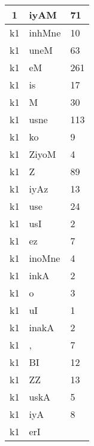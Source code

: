 \documentclass[a4 paper]{article}
\begin{document}
\begin{longtable}{cp{}p{}}
1 & iyAM & 71\\ \midrule k1 & inhMne & 10\\ \midrule k1 & uneM & 63\\ \midrule k1 & eM & 261\\ \midrule k1 & is & 17\\ \midrule k1 & M & 30\\ \midrule k1 & usne & 113\\ \midrule k1 & ko & 9\\ \midrule k1 & ZiyoM & 4\\ \midrule k1 & Z & 89\\ \midrule k1 & iyAz & 13\\ \midrule k1 & use & 24\\ \midrule k1 & usI & 2\\ \midrule k1 & ez & 7\\ \midrule k1 & inoMne & 4\\ \midrule k1 & inkA & 2\\ \midrule k1 & o & 3\\ \midrule k1 & uI & 1\\ \midrule k1 & inakA & 2\\ \midrule k1 & , & 7\\ \midrule k1 & BI & 12\\ \midrule k1 & ZZ & 13\\ \midrule k1 & uskA & 5\\ \midrule k1 & iyA & 8\\ \midrule k1 & erI & 
\end{longtable}
\end{document}
